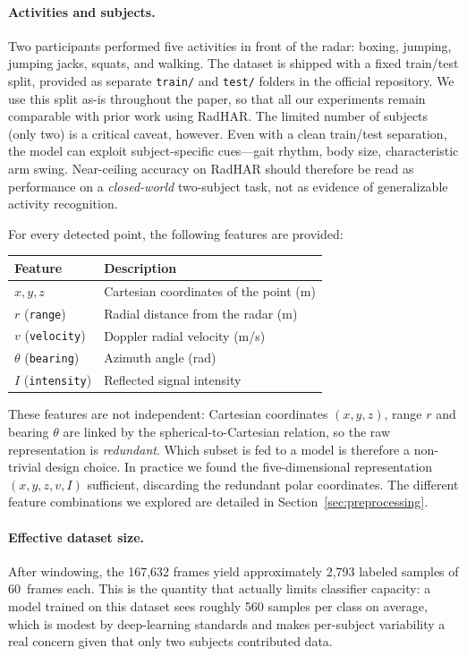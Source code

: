 \documentclass[10pt,twocolumn]{article}
\begin{document}
\paragraph{Activities and subjects.}
Two participants performed five activities in front of the radar: boxing,
jumping, jumping jacks, squats, and walking. The dataset is shipped with a
fixed train/test split, provided as separate \texttt{train/} and
\texttt{test/} folders in the official repository. We use this split as-is
throughout the paper, so that all our experiments remain comparable with
prior work using RadHAR. The limited number of subjects (only two) is a
critical caveat, however. Even with a clean train/test separation, the
model can exploit subject-specific cues---gait rhythm, body size,
characteristic arm swing.
Near-ceiling accuracy on RadHAR should therefore be read as performance
on a \emph{closed-world} two-subject task, not as evidence of
generalizable activity recognition.


For every detected point, the following features are provided:

\begin{center}
\small
\begin{tabular}{ll}
\toprule
Feature & Description \\
\midrule
$x, y, z$                   & Cartesian coordinates of the point (m) \\
$r$ (\texttt{range})        & Radial distance from the radar (m) \\
$v$ (\texttt{velocity})     & Doppler radial velocity (m/s) \\
$\theta$ (\texttt{bearing}) & Azimuth angle (rad) \\
$I$ (\texttt{intensity})    & Reflected signal intensity \\
\bottomrule
\end{tabular}
\end{center}

\noindent These features are not independent: Cartesian coordinates
$(x,y,z)$, range $r$ and bearing $\theta$ are linked by the
spherical-to-Cartesian relation, so the raw representation is
\emph{redundant}. Which subset is fed to a model is therefore a
non-trivial design choice. In practice we found the five-dimensional
representation $(x, y, z, v, I)$ sufficient, discarding the redundant
polar coordinates. The different feature combinations we explored are
detailed in Section~\ref{sec:preprocessing}.

\paragraph{Effective dataset size.}
After windowing, the 167,632 frames yield approximately 2,793 labeled
samples of 60~frames each. This is the quantity that actually limits
classifier capacity: a model trained on this dataset sees roughly 560
samples per class on average, which is modest by deep-learning standards
and makes per-subject variability a real concern given that only two
subjects contributed data.
\end{document}

